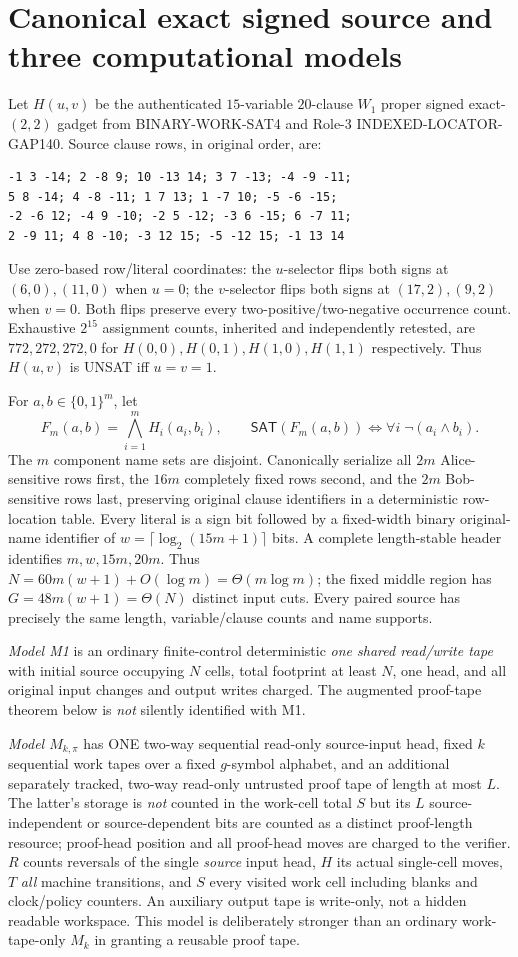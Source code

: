 \documentclass[11pt]{article}
\newcommand{\SAT}{\mathsf{SAT}}
\begin{document}
\section{Canonical exact signed source and three computational models}
Let $H(u,v)$ be the authenticated $15$-variable $20$-clause $W_1$ proper signed exact-$(2,2)$ gadget from BINARY-WORK-SAT4 and Role-3 INDEXED-LOCATOR-GAP140. Source clause rows, in original order, are:
\begin{verbatim}
-1 3 -14; 2 -8 9; 10 -13 14; 3 7 -13; -4 -9 -11;
5 8 -14; 4 -8 -11; 1 7 13; 1 -7 10; -5 -6 -15;
-2 -6 12; -4 9 -10; -2 5 -12; -3 6 -15; 6 -7 11;
2 -9 11; 4 8 -10; -3 12 15; -5 -12 15; -1 13 14
\end{verbatim}
Use zero-based row/literal coordinates: the $u$-selector flips both signs at $(6,0),(11,0)$ when $u=0$; the $v$-selector flips both signs at $(17,2),(9,2)$ when $v=0$. Both flips preserve every two-positive/two-negative occurrence count. Exhaustive $2^{15}$ assignment counts, inherited and independently retested, are $772,272,272,0$ for $H(0,0),H(0,1),H(1,0),H(1,1)$ respectively. Thus $H(u,v)$ is UNSAT iff $u=v=1$.

For $a,b\in\{0,1\}^m$, let
\[
F_m(a,b)=\bigwedge_{i=1}^{m}H_i(a_i,b_i),\qquad
\SAT(F_m(a,b))\iff\forall i\;\neg(a_i\land b_i).\tag{1}
\]
The $m$ component name sets are disjoint. Canonically serialize all $2m$ Alice-sensitive rows first, the $16m$ completely fixed rows second, and the $2m$ Bob-sensitive rows last, preserving original clause identifiers in a deterministic row-location table. Every literal is a sign bit followed by a fixed-width binary original-name identifier of $w=\lceil\log_2(15m+1)\rceil$ bits. A complete length-stable header identifies $m,w,15m,20m$. Thus $N=60m(w+1)+O(\log m)=\Theta(m\log m)$; the fixed middle region has $G=48m(w+1)=\Theta(N)$ distinct input cuts. Every paired source has precisely the same length, variable/clause counts and name supports.

\emph{Model M1} is an ordinary finite-control deterministic \emph{one shared read/write tape} with initial source occupying $N$ cells, total footprint at least $N$, one head, and all original input changes and output writes charged. The augmented proof-tape theorem below is \emph{not} silently identified with M1.

\emph{Model $M_{k,\pi}$} has ONE two-way sequential read-only source-input head, fixed $k$ sequential work tapes over a fixed $g$-symbol alphabet, and an additional separately tracked, two-way read-only untrusted proof tape of length at most $L$. The latter's storage is \emph{not} counted in the work-cell total $S$ but its $L$ source-independent or source-dependent bits are counted as a distinct proof-length resource; proof-head position and all proof-head moves are charged to the verifier. $R$ counts reversals of the single \emph{source} input head, $H$ its actual single-cell moves, $T$ \emph{all} machine transitions, and $S$ every visited work cell including blanks and clock/policy counters. An auxiliary output tape is write-only, not a hidden readable workspace. This model is deliberately stronger than an ordinary work-tape-only $M_k$ in granting a reusable proof tape.
\end{document}
